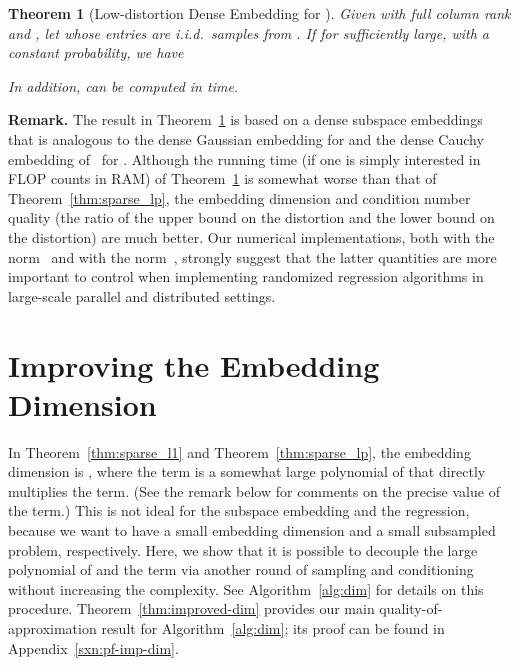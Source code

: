 \documentclass[11pt]{article}
\newtheorem{theorem}{Theorem}
\begin{document}
\begin{theorem}[Low-distortion Dense Embedding for ]
  \label{thm:dense_lp}
  Given  with full column rank and , let
   whose entries are i.i.d.\ samples from
  .
  If  for  sufficiently large, with a constant
  probability, we have
  
  In addition,  can be computed in 
   time.
\end{theorem}

\noindent
\textbf{Remark.}
The result in Theorem~\ref{thm:dense_lp} is based on a dense  subspace
embeddings that is analogous to the dense Gaussian embedding for  and
the dense Cauchy embedding of~\cite{SW11} for .
Although the running time (if one is simply interested in FLOP counts in RAM) of
Theorem~\ref{thm:dense_lp} is somewhat worse than that of
Theorem~\ref{thm:sparse_lp}, the embedding dimension and condition number
quality (the ratio of the upper bound on the distortion and the lower bound on
the distortion) are much better.
Our numerical implementations, both with the  norm~\cite{CDMMMW13_SODA}
and with the  norm~\cite{MSM11_TR}, strongly suggest that the latter
quantities are more important to control when implementing randomized regression
algorithms in large-scale parallel and distributed settings.


\section{Improving the Embedding Dimension}
\label{sxn:improve} 

In Theorem~\ref{thm:sparse_l1} and Theorem~\ref{thm:sparse_lp}, the embedding
dimension is , where the
 term is a somewhat large polynomial of  that directly multiplies
the  term.  
(See the remark below for comments on the precise value of the  term.)
This is not ideal for the subspace embedding and the  regression,
because we want to have a small embedding dimension and a small subsampled
problem, respectively.
Here, we show that it is possible to decouple the large polynomial of  and
the  term via another round of sampling and
conditioning without increasing the complexity.
See Algorithm~\ref{alg:dim} for details on this procedure.
Theorem~\ref{thm:improved-dim} provides our main quality-of-approximation result
for Algorithm~\ref{alg:dim}; its proof can be found in
Appendix~\ref{sxn:pf-imp-dim}.
\end{document}

